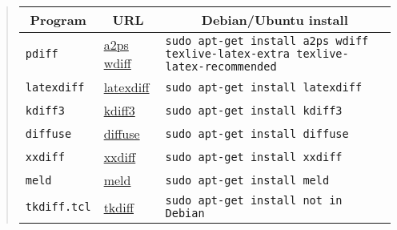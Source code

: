 \documentclass[%
oneside,                 %
final,                   %
10pt]{article}
\begin{document}
\begin{quote}\begin{tabular}{lll}
\hline
\multicolumn{1}{c}{ Program } & \multicolumn{1}{c}{ URL } & \multicolumn{1}{c}{ Debian/Ubuntu install } \\
\hline
{\fontsize{10pt}{10pt}\Verb!pdiff!}                                                                              & \href{{http://www.gnu.org/software/a2ps/}}{a2ps} \href{{http://www.gnu.org/software/wdiff/}}{wdiff} & {\fontsize{10pt}{10pt}\Verb!sudo apt-get install a2ps wdiff texlive-latex-extra texlive-latex-recommended!}      \\
{\fontsize{10pt}{10pt}\Verb!latexdiff!}                                                                          & \href{{http://www.ctan.org/pkg/latexdiff}}{latexdiff}                                          & {\fontsize{10pt}{10pt}\Verb!sudo apt-get install latexdiff!}                                                     \\
{\fontsize{10pt}{10pt}\Verb!kdiff3!}                                                                             & \href{{http://kdiff3.sourceforge.net/}}{kdiff3}                                                & {\fontsize{10pt}{10pt}\Verb!sudo apt-get install kdiff3!}                                                        \\
{\fontsize{10pt}{10pt}\Verb!diffuse!}                                                                            & \href{{http://diffuse.sourceforge.net/}}{diffuse}                                              & {\fontsize{10pt}{10pt}\Verb!sudo apt-get install diffuse!}                                                       \\
{\fontsize{10pt}{10pt}\Verb!xxdiff!}                                                                             & \href{{http://xxdiff.sourceforge.net/local/}}{xxdiff}                                          & {\fontsize{10pt}{10pt}\Verb!sudo apt-get install xxdiff!}                                                        \\
{\fontsize{10pt}{10pt}\Verb!meld!}                                                                               & \href{{http://meldmerge.org/}}{meld}                                                           & {\fontsize{10pt}{10pt}\Verb!sudo apt-get install meld!}                                                          \\
{\fontsize{10pt}{10pt}\Verb!tkdiff.tcl!}                                                                         & \href{{https://sourceforge.net/projects/tkdiff/}}{tkdiff}                                      & {\fontsize{10pt}{10pt}\Verb!sudo apt-get install not in Debian!}                                                 \\
\hline
\end{tabular}\end{quote}

\noindent



\printindex
\end{document}
